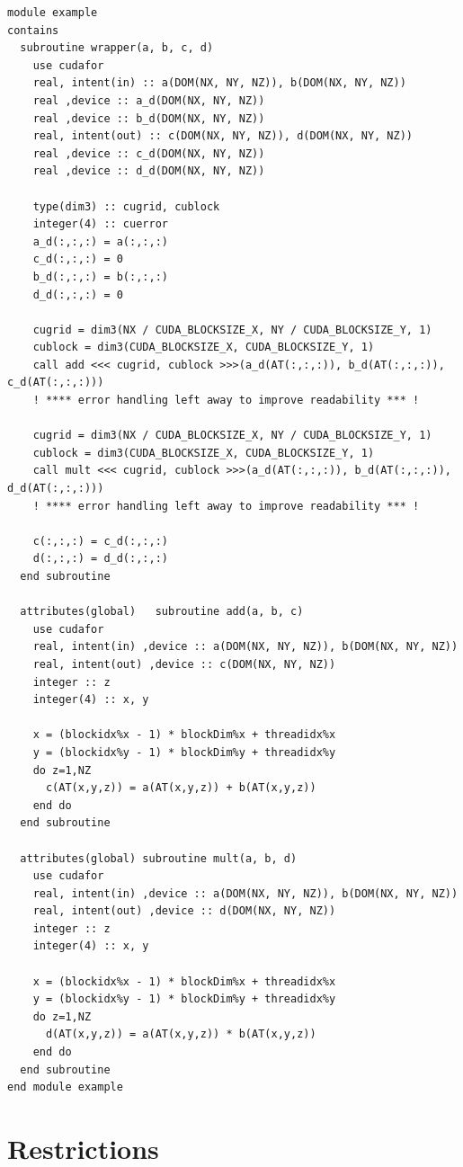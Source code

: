 \begin{lstlisting}[name=exampleGPU, label=listing:exampleGPU, caption={GPU version of the hybrid code shown above}]
module example
contains
  subroutine wrapper(a, b, c, d)
    use cudafor
    real, intent(in) :: a(DOM(NX, NY, NZ)), b(DOM(NX, NY, NZ))
    real ,device :: a_d(DOM(NX, NY, NZ))
    real ,device :: b_d(DOM(NX, NY, NZ))
    real, intent(out) :: c(DOM(NX, NY, NZ)), d(DOM(NX, NY, NZ))
    real ,device :: c_d(DOM(NX, NY, NZ))
    real ,device :: d_d(DOM(NX, NY, NZ))

    type(dim3) :: cugrid, cublock
    integer(4) :: cuerror
    a_d(:,:,:) = a(:,:,:)
    c_d(:,:,:) = 0
    b_d(:,:,:) = b(:,:,:)
    d_d(:,:,:) = 0

    cugrid = dim3(NX / CUDA_BLOCKSIZE_X, NY / CUDA_BLOCKSIZE_Y, 1)
    cublock = dim3(CUDA_BLOCKSIZE_X, CUDA_BLOCKSIZE_Y, 1)
    call add <<< cugrid, cublock >>>(a_d(AT(:,:,:)), b_d(AT(:,:,:)), c_d(AT(:,:,:)))
    ! **** error handling left away to improve readability *** !

    cugrid = dim3(NX / CUDA_BLOCKSIZE_X, NY / CUDA_BLOCKSIZE_Y, 1)
    cublock = dim3(CUDA_BLOCKSIZE_X, CUDA_BLOCKSIZE_Y, 1)
    call mult <<< cugrid, cublock >>>(a_d(AT(:,:,:)), b_d(AT(:,:,:)), d_d(AT(:,:,:)))
    ! **** error handling left away to improve readability *** !

    c(:,:,:) = c_d(:,:,:)
    d(:,:,:) = d_d(:,:,:)
  end subroutine

  attributes(global)   subroutine add(a, b, c)
    use cudafor
    real, intent(in) ,device :: a(DOM(NX, NY, NZ)), b(DOM(NX, NY, NZ))
    real, intent(out) ,device :: c(DOM(NX, NY, NZ))
    integer :: z
    integer(4) :: x, y

    x = (blockidx%x - 1) * blockDim%x + threadidx%x
    y = (blockidx%y - 1) * blockDim%y + threadidx%y
    do z=1,NZ
      c(AT(x,y,z)) = a(AT(x,y,z)) + b(AT(x,y,z))
    end do
  end subroutine

  attributes(global) subroutine mult(a, b, d)
    use cudafor
    real, intent(in) ,device :: a(DOM(NX, NY, NZ)), b(DOM(NX, NY, NZ))
    real, intent(out) ,device :: d(DOM(NX, NY, NZ))
    integer :: z
    integer(4) :: x, y

    x = (blockidx%x - 1) * blockDim%x + threadidx%x
    y = (blockidx%y - 1) * blockDim%y + threadidx%y
    do z=1,NZ
      d(AT(x,y,z)) = a(AT(x,y,z)) * b(AT(x,y,z))
    end do
  end subroutine
end module example
\end{lstlisting}

\clearpage
\section{Restrictions} \label{sec:frameworkRestriction}

